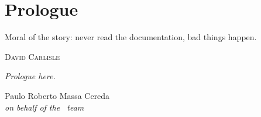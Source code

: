 \chapter*{Prologue}
\label{chap:prologue}

\epigraph{Moral of the story: never read the
documentation, bad things happen.}{\textsc{David Carlisle}}

\emph{Prologue here.}

\vfill

\begin{flushright}
Paulo Roberto Massa Cereda\\
\emph{on behalf of the \arara\ team}
\end{flushright}
